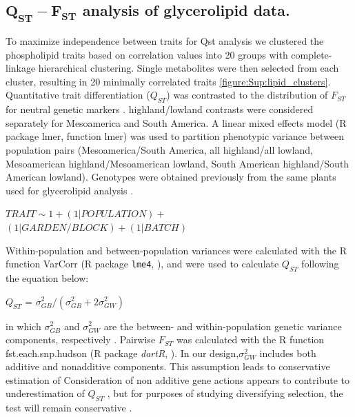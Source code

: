 \documentclass[9pt,twocolumn,twoside,lineno]{biorxiv}
\begin{document}
\subsection{$\mathbf{Q_{ST}-F_{ST}}$ analysis of glycerolipid data.}
To maximize independence between traits for Qst analysis we clustered the phospholipid traits based on correlation values into 20 groups with complete-linkage hierarchical clustering. Single metabolites were then selected from each cluster, resulting in 20 minimally correlated traits \cref{figure:Sup:lipid_clusters}. Quantitative trait differentiation ($Q_{ST}$) was contrasted to the distribution of $F_{ST}$ for neutral genetic markers \cite{whitlock2008evolutionary}. 
highland/lowland contrasts were considered separately for Mesoamerica and South America.
A linear mixed effects model (R package lmer, function lmer) was used to partition phenotypic variance between population pairs (Mesoamerica/South America, all highland/all lowland, Mesoamerican highland/Mesoamerican lowland, South American highland/South American lowland). 
Genotypes were obtained previously from the same plants used for glycerolipid analysis \cite{Janzen2021-lz}.
\begin{center}
${ TRAIT \sim 1 + (1|POPULATION) + }$\\
${(1|GARDEN/BLOCK) + (1|BATCH)}$
\end{center}
Within-population and between-population variances were calculated with the R function VarCorr (R package \texttt{lme4}, \citealp{bates2014lme4}), and were used to calculate $Q_{ST}$ following the equation below:
\begin{center}
$Q_{ST}$ = \(\sigma^{2}_{GB}/(\sigma^{2}_{GB}+2\sigma^{2}_{GW})\)
\end{center}
\noindent in which $\sigma^{2}_{GB}$ and $\sigma^{2}_{GW}$ are the between- and within-population genetic variance components, respectively \cite{Leinonen2013-ic}.
Pairwise $F_{ST}$ was calculated with the R function fst.each.snp.hudson (R package \textit{dartR}, \citealp{gruber2018dartr}).
In our design,$\sigma^{2}_{GW}$ includes both additive and nonadditive components. 
This assumption leads to conservative estimation of 
Consideration of non additive gene actions  appears  to  contribute  to  underestimation  of $Q_{ST}$ \cite{Whitlock1999-gu}, but for purposes of studying diversifying selection, the test will remain conservative \cite{Kronholm2010-by}.
\end{document}
